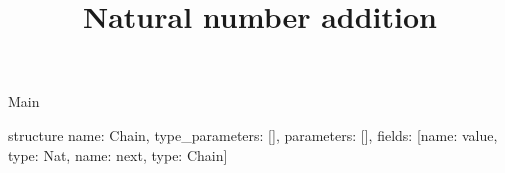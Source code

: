 \begin{lexlean}{Main}
\title{Natural number addition}
\begin{semanticmodule}
structure{
  name: Chain,
  type_parameters: [],
  parameters: [],
  fields: [{name: value, type: Nat}, {name: next, type: Chain}]
}
\end{semanticmodule}
\end{lexlean}
